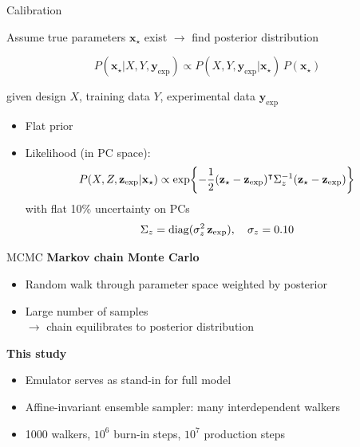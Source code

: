 \documentclass{beamer}
\newcommand{\tran}{^\intercal}
\newcommand{\x}{\mathbf x}
\newcommand{\y}{\mathbf y}
\newcommand{\z}{\mathbf z}
\newcommand{\xs}{\x_\star}
\newcommand{\yexp}{\y_\text{exp}}
\begin{document}
\begin{frame}{Calibration}
  \begin{center}
    Assume true parameters $\xs$ exist $\rightarrow$ find posterior distribution
  \end{center}
  \begin{equation*}
    P(\xs|X,Y,\yexp) \propto P(X,Y,\yexp|\xs) \, P(\xs)
  \end{equation*}
  \begin{center}
    given design $X$, training data $Y$, experimental data $\yexp$
  \end{center}
  \begin{itemize}
    \item Flat prior
    \item Likelihood (in PC space):
      \begin{equation*}
        P(X,Z,\z\ex|\x\st) \propto
        \exp\biggl\{
          -\frac{1}{2} (\z\st - \z\ex)\tran \Sigma_z^{-1} (\z\st - \z\ex)
        \biggr\}
      \end{equation*}
      with flat 10\% uncertainty on PCs
      \begin{equation*}
        \Sigma_z = \text{diag}(\sigma^2_z\,\z\ex), \quad
        \sigma_z = 0.10
      \end{equation*}
  \end{itemize}
\end{frame}

\begin{frame}{MCMC}
  \centering
  \textbf{Markov chain Monte Carlo}
  \vspace{1ex}
  \begin{itemize}
    \item Random walk through parameter space weighted by posterior
    \item Large number of samples \\
      $\rightarrow$ chain equilibrates to posterior distribution
  \end{itemize}
  \vspace{3ex}
  \textbf{This study}
  \vspace{1ex}
  \begin{itemize}
    \item Emulator serves as stand-in for full model
    \item Affine-invariant ensemble sampler: many interdependent walkers
    \item 1000 walkers, $10^6$ burn-in steps, $10^7$ production steps
  \end{itemize}
\end{frame}
\end{document}
